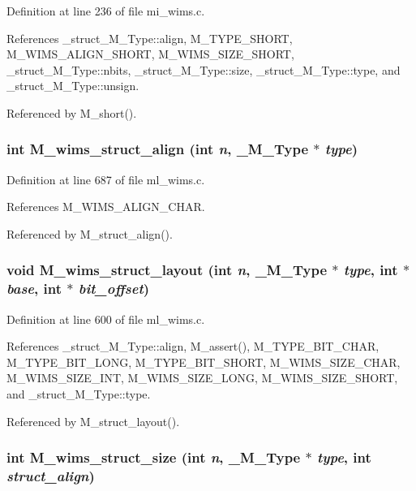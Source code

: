 Definition at line 236 of file mi\_\-wims.c.

References \_\-struct\_\-M\_\-Type::align, M\_\-TYPE\_\-SHORT, M\_\-WIMS\_\-ALIGN\_\-SHORT, M\_\-WIMS\_\-SIZE\_\-SHORT, \_\-struct\_\-M\_\-Type::nbits, \_\-struct\_\-M\_\-Type::size, \_\-struct\_\-M\_\-Type::type, and \_\-struct\_\-M\_\-Type::unsign.

Referenced by M\_\-short().
\subsubsection{\setlength{\rightskip}{0pt plus 5cm}int M\_\-wims\_\-struct\_\-align (int {\em n}, \bf{\_\-M\_\-Type} $\ast$ {\em type})}\label{m__wims_8h_7d6387f52760c1d814b74b974c4e0932}




Definition at line 687 of file ml\_\-wims.c.

References M\_\-WIMS\_\-ALIGN\_\-CHAR.

Referenced by M\_\-struct\_\-align().
\subsubsection{\setlength{\rightskip}{0pt plus 5cm}void M\_\-wims\_\-struct\_\-layout (int {\em n}, \bf{\_\-M\_\-Type} $\ast$ {\em type}, int $\ast$ {\em base}, int $\ast$ {\em bit\_\-offset})}\label{m__wims_8h_eb40c11e0e046cebe24f4b67a55d4336}




Definition at line 600 of file ml\_\-wims.c.

References \_\-struct\_\-M\_\-Type::align, M\_\-assert(), M\_\-TYPE\_\-BIT\_\-CHAR, M\_\-TYPE\_\-BIT\_\-LONG, M\_\-TYPE\_\-BIT\_\-SHORT, M\_\-WIMS\_\-SIZE\_\-CHAR, M\_\-WIMS\_\-SIZE\_\-INT, M\_\-WIMS\_\-SIZE\_\-LONG, M\_\-WIMS\_\-SIZE\_\-SHORT, and \_\-struct\_\-M\_\-Type::type.

Referenced by M\_\-struct\_\-layout().
\subsubsection{\setlength{\rightskip}{0pt plus 5cm}int M\_\-wims\_\-struct\_\-size (int {\em n}, \bf{\_\-M\_\-Type} $\ast$ {\em type}, int {\em struct\_\-align})}\label{m__wims_8h_c046d2dbeca5c92cd1e6f6b73f7b97c6}




